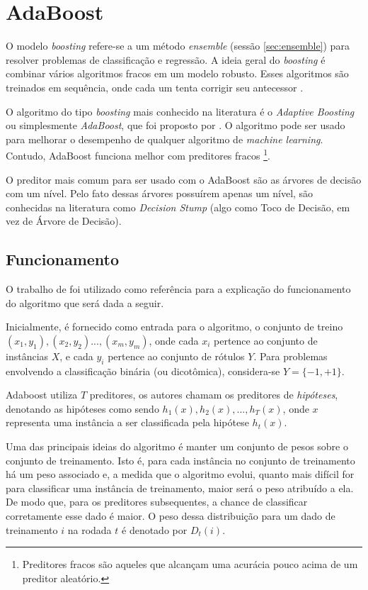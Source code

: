\section{AdaBoost}

O modelo \textit{boosting} refere-se a um método \textit{ensemble} (sessão \ref{sec:ensemble}) para resolver problemas de classificação e regressão. A ideia geral do \textit{boosting} é  combinar vários algoritmos fracos em um modelo robusto. Esses algoritmos são treinados em sequência, onde cada um tenta corrigir seu antecessor \cite{Kearns:1988}.

O algoritmo do tipo \textit{boosting} mais conhecido na literatura é o \textit{Adaptive Boosting} ou simplesmente \textit{AdaBoost}, que foi proposto por \cite{Freund:1997}. O algoritmo pode ser usado para melhorar o desempenho de qualquer algoritmo de \textit{machine learning}. Contudo, AdaBoost funciona melhor com preditores fracos \footnote{Preditores fracos são aqueles que alcançam uma acurácia pouco acima de um preditor aleatório.}.

O preditor mais comum para ser usado com o AdaBoost são as árvores de decisão com um nível. Pelo fato dessas árvores possuírem apenas um nível, são conhecidas na literatura como \textit{Decision Stump} (algo como Toco de Decisão, em vez de Árvore de Decisão).

\subsection{Funcionamento}
O trabalho de \cite{Freund:1999} foi utilizado como referência para a explicação do funcionamento do algoritmo que será dada a seguir.

Inicialmente, é fornecido como entrada para o algoritmo, o conjunto de treino $(x_1, y_1), (x_2, y_2) ..., (x_m, y_m)$, onde cada $x_i$ pertence ao conjunto de instâncias $X$, e cada $y_i$ pertence ao conjunto de rótulos $Y$. Para problemas envolvendo a classificação binária (ou dicotômica), considera-se $Y = \{-1, +1\}$. 

Adaboost utiliza $T$ preditores, os autores chamam os preditores de \textit{hipóteses}, denotando as hipóteses como sendo $h_1(x), h_2(x),..., h_T(x)$, onde $x$ representa uma instância a ser classificada pela hipótese $h_t(x)$.

Uma das principais ideias do algoritmo é manter um conjunto de
pesos sobre o conjunto de treinamento. Isto é, para cada instância no conjunto de treinamento há um peso associado e, a medida que o algoritmo evolui, quanto mais difícil for para classificar uma instância de treinamento, maior será o peso atribuído a ela. De modo que, para os preditores subsequentes, a chance de classificar corretamente esse dado é maior. O peso dessa distribuição para um dado de treinamento $i$ na rodada $t$ é denotado por $D_t(i)$.


